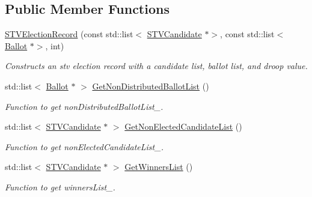 \subsection*{Public Member Functions}
\begin{DoxyCompactItemize}
\item 
\hyperlink{classSTVElectionRecord_a0ede176edc0967c98a23be4754c27e9e}{S\+T\+V\+Election\+Record} (const std\+::list$<$ \hyperlink{classSTVCandidate}{S\+T\+V\+Candidate} $\ast$$>$, const std\+::list$<$ \hyperlink{classBallot}{Ballot} $\ast$$>$, int)
\begin{DoxyCompactList}\small\item\em Constructs an stv election record with a candidate list, ballot list, and droop value. \end{DoxyCompactList}\item 
\mbox{\label{classSTVElectionRecord_aacdd25995d5693c501bf1575bf5d1233}} 
std\+::list$<$ \hyperlink{classBallot}{Ballot} $\ast$ $>$ \hyperlink{classSTVElectionRecord_aacdd25995d5693c501bf1575bf5d1233}{Get\+Non\+Distributed\+Ballot\+List} ()
\begin{DoxyCompactList}\small\item\em Function to get non\+Distributed\+Ballot\+List\+\_\+. \end{DoxyCompactList}\item 
\mbox{\label{classSTVElectionRecord_ac3c03c1d3a343afbebd43acc1a64fbee}} 
std\+::list$<$ \hyperlink{classSTVCandidate}{S\+T\+V\+Candidate} $\ast$ $>$ \hyperlink{classSTVElectionRecord_ac3c03c1d3a343afbebd43acc1a64fbee}{Get\+Non\+Elected\+Candidate\+List} ()
\begin{DoxyCompactList}\small\item\em Function to get non\+Elected\+Candidate\+List\+\_\+. \end{DoxyCompactList}\item 
\mbox{\label{classSTVElectionRecord_a1e1d4ea12462b12789110b1bcd1df580}} 
std\+::list$<$ \hyperlink{classSTVCandidate}{S\+T\+V\+Candidate} $\ast$ $>$ \hyperlink{classSTVElectionRecord_a1e1d4ea12462b12789110b1bcd1df580}{Get\+Winners\+List} ()
\begin{DoxyCompactList}\small\item\em Function to get winners\+List\+\_\+. \end{DoxyCompactList}\item 

\end{DoxyCompactItemize}
